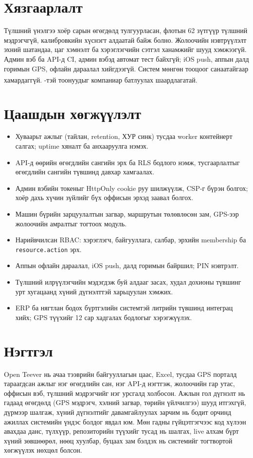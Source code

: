 \documentclass[
12pt,
oneside,
english,
onehalfspacing,
nolistspacing,
headsepline,
]{MUST-Thesis}
\newcommand{\batlah}[1]{#1\textsuperscript{\dag}}
\begin{document}
\section{Хязгаарлалт}

Түлшний үнэлгээ хоёр сарын өгөгдөлд тулгуурласан, флотын 62 зүтгүүр түлшний мэдрэгчгүй, калибровкийн хүснэгт алдаатай байж болно. Жолоочийн нэвтрүүлэлт эхний шатандаа, цаг хэмнэлт ба хэрэглэгчийн сэтгэл ханамжийг шууд хэмжээгүй. Админ вэб ба API-д CI, админ вэбэд автомат тест байхгүй; iOS push, аппын далд горимын GPS, офлайн дараалал хийгдээгүй. Систем мөнгөн тооцоог санаатайгаар хамардаггүй. \batlah{}-тэй тоонуудыг компаниар батлуулах шаардлагатай.

\section{Цаашдын хөгжүүлэлт}

\begin{itemize}
    \item Хуваарьт ажлыг (тайлан, retention, ХУР синк) тусдаа worker контейнерт салгах; uptime хяналт ба анхааруулга нэмэх.
    \item API-д өөрийн өгөгдлийн сангийн эрх ба RLS бодлого нэмж, тусгаарлалтыг өгөгдлийн сангийн түвшинд давхар хамгаалах.
    \item Админ вэбийн токеныг HttpOnly cookie руу шилжүүлж, CSP-г бүрэн болгох; хоёр дахь хүчин зүйлийг бүх оффисын эрхэд заавал болгох.
    \item Машин бүрийн зарцуулалтын загвар, маршрутын төлөвлөсөн зам, GPS-ээр жолоочийн амралтыг тогтоох модуль.
    \item Нарийвчилсан RBAC: хэрэглэгч, байгууллага, салбар, эрхийн membership ба \texttt{resource.action} эрх.
    \item Аппын офлайн дараалал, iOS push, далд горимын байршил; PIN нэвтрэлт.
    \item Түлшний илрүүлэгчийн мэдэгдэж буй алдааг засах, худал дохионы түвшинг урт хугацаанд хүний дүгнэлттэй харьцуулан хэмжих.
    \item ERP ба нягтлан бодох бүртгэлийн системтэй литрийн түвшинд интеграц хийх; GPS түүхийг 12 сар хадгалах бодлогыг хэрэгжүүлэх.
\end{itemize}

\section{Нэгтгэл}

Open Teever нь ачаа тээврийн байгууллагын цаас, Excel, тусдаа GPS порталд тараагдсан ажлыг нэг өгөгдлийн сан, нэг API-д нэгтгэж, жолоочийн гар утас, оффисын вэб, түлшний мэдрэгчийг нэг урсгалд холбосон. Ажлын гол дүгнэлт нь гадаад өгөгдөлд (GPS мэдрэгч, хэлний загвар, төрийн үйлчилгээ) шууд итгэхгүй, дүрмээр шалгаж, хүний дүгнэлтийг давамгайлуулах зарчим нь бодит орчинд ажиллах системийн үндэс болдог явдал юм. Мөн гадны гүйцэтгэгчээс код хүлээн авахдаа данс, түлхүүр, репозиторийн түүхийг тусад нь шалгах, live алхам бүрт хүний зөвшөөрөл, нөөц хуулбар, буцаах зам бэлдэх нь системийг тогтвортой хөгжүүлэх нөхцөл болсон.
\end{document}
